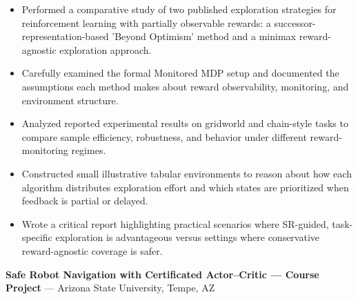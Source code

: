 \documentclass[11pt]{article}
\begin{document}
\begin{itemize}[leftmargin=*,noitemsep]
  
  \item Performed a comparative study of two published exploration strategies for reinforcement learning with partially observable rewards: a successor-representation-based 'Beyond Optimism' method and a minimax reward-agnostic exploration approach.
  
  \item Carefully examined the formal Monitored MDP setup and documented the assumptions each method makes about reward observability, monitoring, and environment structure.
  
  \item Analyzed reported experimental results on gridworld and chain-style tasks to compare sample efficiency, robustness, and behavior under different reward-monitoring regimes.
  
  \item Constructed small illustrative tabular environments to reason about how each algorithm distributes exploration effort and which states are prioritized when feedback is partial or delayed.
  
  \item Wrote a critical report highlighting practical scenarios where SR-guided, task-specific exploration is advantageous versus settings where conservative reward-agnostic coverage is safer.
  
\end{itemize}


\vspace{2pt}

\textbf{ Safe Robot Navigation with Certificated Actor–Critic — Course Project } --- Arizona State University, Tempe, AZ\\
\end{document}
